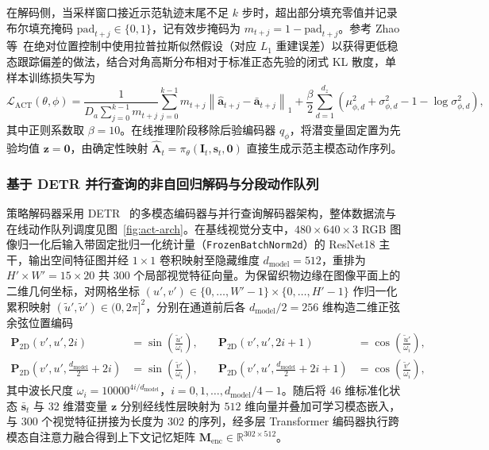 在解码侧，当采样窗口接近示范轨迹末尾不足 $k$ 步时，超出部分填充零值并记录布尔填充掩码 $\text{pad}_{t+j} \in \{0, 1\}$，记有效步掩码为 $m_{t+j} = 1 - \text{pad}_{t+j}$。参考 Zhao 等~\cite{zhao2023learning}在绝对位置控制中使用拉普拉斯似然假设（对应 $L_1$ 重建误差）以获得更低稳态跟踪偏差的做法，结合对角高斯分布相对于标准正态先验的闭式 KL 散度，单样本训练损失写为
\begin{equation}
  \mathcal{L}_{\text{ACT}}(\theta, \phi) = \frac{1}{D_a \sum_{j=0}^{k-1} m_{t+j}} \sum_{j=0}^{k-1} m_{t+j} \left\|\hat{\bm{a}}_{t+j} - \bar{\bm{a}}_{t+j}\right\|_1
  + \frac{\beta}{2} \sum_{d=1}^{d_z} \left(\mu_{\phi,d}^2 + \sigma_{\phi,d}^2 - 1 - \log\sigma_{\phi,d}^2\right),
  \label{eq:act-loss}
\end{equation}
其中正则系数取 $\beta = 10$。在线推理阶段移除后验编码器 $q_{\phi}$，将潜变量固定置为先验均值 $\bm{z} = \bm{0}$，由确定性映射 $\hat{\bm{A}}_t = \pi_{\theta}(\bm{I}_t, \bm{s}_t, \bm{0})$ 直接生成示范主模态动作序列。

\subsubsection{基于 DETR 并行查询的非自回归解码与分段动作队列}

策略解码器采用 DETR~\cite{carion2020end} 的多模态编码器与并行查询解码器架构，整体数据流与在线动作队列调度见图~\ref{fig:act-arch}。在基线视觉分支中，$480\times 640\times 3$ RGB 图像归一化后输入带固定批归一化统计量（\texttt{FrozenBatchNorm2d}）的 ResNet18 主干，输出空间特征图并经 $1\times 1$ 卷积映射至隐藏维度 $d_{\text{model}} = 512$，重排为 $H'\times W' = 15\times 20$ 共 $300$ 个局部视觉特征向量。为保留织物边缘在图像平面上的二维几何坐标，对网格坐标 $(u', v') \in \{0,\dots,W'-1\}\times\{0,\dots,H'-1\}$ 作归一化累积映射 $(\tilde{u}', \tilde{v}') \in (0, 2\pi]^2$，分别在通道前后各 $d_{\text{model}}/2 = 256$ 维构造二维正弦余弦位置编码
\begin{equation}
  \begin{aligned}
    \bm{P}_{2\text{D}}(v', u', 2i) &= \sin\!\left(\frac{\tilde{u}'}{\omega_i}\right), &\quad
    \bm{P}_{2\text{D}}(v', u', 2i+1) &= \cos\!\left(\frac{\tilde{u}'}{\omega_i}\right), \\
    \bm{P}_{2\text{D}}\!\left(v', u', \frac{d_{\text{model}}}{2} + 2i\right) &= \sin\!\left(\frac{\tilde{v}'}{\omega_i}\right), &\quad
    \bm{P}_{2\text{D}}\!\left(v', u', \frac{d_{\text{model}}}{2} + 2i + 1\right) &= \cos\!\left(\frac{\tilde{v}'}{\omega_i}\right),
  \end{aligned}
  \label{eq:pos-embed-2d}
\end{equation}
其中波长尺度 $\omega_i = 10000^{4i / d_{\text{model}}}$，$i = 0, 1, \dots, d_{\text{model}}/4 - 1$。随后将 46 维标准化状态 $\bar{\bm{s}}_t$ 与 32 维潜变量 $\bm{z}$ 分别经线性层映射为 $512$ 维向量并叠加可学习模态嵌入，与 300 个视觉特征拼接为长度为 $302$ 的序列，经多层 Transformer 编码器执行跨模态自注意力融合得到上下文记忆矩阵 $\bm{M}_{\text{enc}} \in \mathbb{R}^{302\times 512}$。

